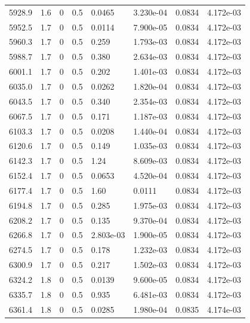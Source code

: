 \documentclass[preview]{standalone}
\begin{document}
{{{{{{\begin{tabular}{L{1.2cm}C{1.2cm} C{0.3cm}C{0.5cm} C{1.4cm}C{1.4cm} C{1.4cm}C{1.4cm}}
  5928.9  &   1.6  & 0     & 0.5 &  0.0465  & 3.230e-04  & 0.0834 &  4.172e-03   \\ 
  5952.5  &   1.7  & 0     & 0.5 &  0.0114  & 7.900e-05  & 0.0834 &  4.172e-03   \\ 
  5960.3  &   1.7  & 0     & 0.5 &  0.259  & 1.793e-03  & 0.0834 &  4.172e-03   \\ 
  5988.7  &   1.7  & 0     & 0.5 &  0.380  & 2.634e-03  & 0.0834 &  4.172e-03   \\ 
  6001.1  &   1.7  & 0     & 0.5 &  0.202  & 1.401e-03  & 0.0834 &  4.172e-03   \\ 
  6035.0  &   1.7  & 0     & 0.5 &  0.0262  & 1.820e-04  & 0.0834 &  4.172e-03   \\ 
  6043.5  &   1.7  & 0     & 0.5 &  0.340  & 2.354e-03  & 0.0834 &  4.172e-03   \\ 
  6067.5  &   1.7  & 0     & 0.5 &  0.171  & 1.187e-03  & 0.0834 &  4.172e-03   \\ 
  6103.3  &   1.7  & 0     & 0.5 &  0.0208  & 1.440e-04  & 0.0834 &  4.172e-03   \\ 
  6120.6  &   1.7  & 0     & 0.5 &  0.149  & 1.035e-03  & 0.0834 &  4.172e-03   \\ 
  6142.3  &   1.7  & 0     & 0.5 &  1.24  & 8.609e-03  & 0.0834 &  4.172e-03   \\ 
  6152.4  &   1.7  & 0     & 0.5 &  0.0653  & 4.520e-04  & 0.0834 &  4.172e-03   \\ 
  6177.4  &   1.7  & 0     & 0.5 &  1.60  & 0.0111  & 0.0834 &  4.172e-03   \\ 
  6194.8  &   1.7  & 0     & 0.5 &  0.285  & 1.975e-03  & 0.0834 &  4.172e-03   \\ 
  6208.2  &   1.7  & 0     & 0.5 &  0.135  & 9.370e-04  & 0.0834 &  4.172e-03   \\ 
  6266.8  &   1.7  & 0     & 0.5 &  2.803e-03  & 1.900e-05  & 0.0834 &  4.172e-03   \\ 
  6274.5  &   1.7  & 0     & 0.5 &  0.178  & 1.232e-03  & 0.0834 &  4.172e-03   \\ 
  6300.9  &   1.7  & 0     & 0.5 &  0.217  & 1.502e-03  & 0.0834 &  4.172e-03   \\ 
  6324.2  &   1.8  & 0     & 0.5 &  0.0139  & 9.600e-05  & 0.0834 &  4.172e-03   \\ 
  6335.7  &   1.8  & 0     & 0.5 &  0.935  & 6.481e-03  & 0.0834 &  4.172e-03   \\ 
  6361.4  &   1.8  & 0     & 0.5 &  0.0285  & 1.980e-04  & 0.0835 &  4.174e-03   \\ 

\end{tabular}}}}}}}
\end{document}
